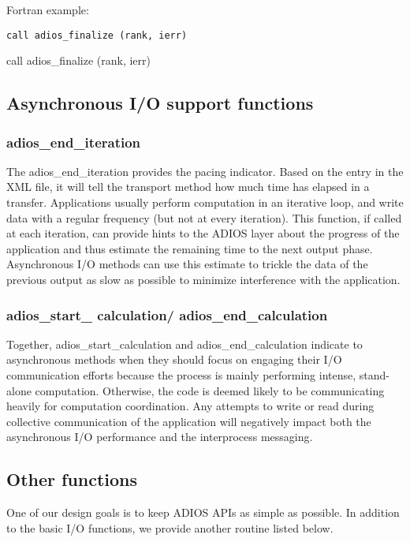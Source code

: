Fortran example: 
\begin{lstlisting}[alsolanguage=Fortran,caption={},label={}]
call adios_finalize (rank, ierr)
\end{lstlisting}

call adios\_finalize (rank, ierr)

\subsection{Asynchronous I/O support functions}

\subsubsection{adios\_end\_iteration}

The adios\_end\_iteration provides the pacing indicator. Based on the entry in 
the XML file, it will tell the transport method how much time has elapsed in a 
transfer. Applications usually perform computation in an iterative loop, and write
data with a regular frequency (but not at every iteration). This function, if called
at each iteration, can provide hints to the ADIOS layer about the progress of the 
application and thus estimate the remaining time to the next output phase. Asynchronous
I/O methods can use this estimate to trickle the data of the previous output as slow
as possible to minimize interference with the application. 

\subsubsection{adios\_start\_ calculation/ adios\_end\_calculation}

Together, adios\_start\_calculation and adios\_end\_calculation indicate  
to asynchronous methods when they should focus on engaging their I/O communication 
efforts because the process is mainly performing intense, stand-alone computation. 
Otherwise, the code is deemed likely to be communicating heavily for computation 
coordination. Any attempts to write or read during collective communication of 
the application will negatively 
impact both the asynchronous I/O performance and the interprocess messaging.

\subsection{Other functions}

One of our design goals is to keep ADIOS APIs as simple as possible. In addition 
to the basic I/O functions, we provide another routine listed below. 

